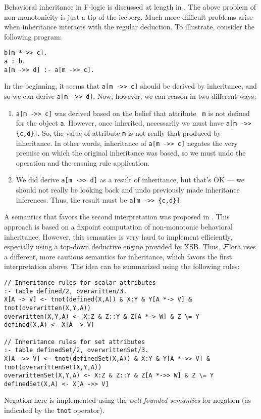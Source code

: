\documentclass[11pt]{article}
\newcommand{\FLORA}{{\mbox{${\cal F}${\sc lora}}}\xspace}
\begin{document}
Behavioral inheritance in F-logic is discussed at length in \cite{KLW95}.
The above problem of non-monotonicity is just a tip of the iceberg. Much
more difficult problems arise when inheritance interacts with the regular
deduction. To illustrate, consider the following program:
\begin{verbatim}
b[m *->> c].
a : b.
a[m ->> d] :- a[m ->> c].
\end{verbatim}
In the beginning, it seems that \verb|a[m ->> c]| should be derived by
inheritance, and so we can derive \verb|a[m ->> d]|. Now, however, we can
reason in two different ways:
\begin{enumerate}
\item \verb|a[m ->> c]| was derived based on the belief that attribute {\tt
    m} is not defined for the object {\tt a}. However, once inherited,
  necessarily we must have \verb|a[m ->> {c,d}]|. So, the value of
  attribute {\tt m} is not really that produced by inheritance. In other
  words, inheritance of \verb|a[m ->> c]| negates the very premise on which
  the original inheritance was based, so we must undo the operation and the
  ensuing rule application.
\item We did derive \verb|a[m ->> d]| as a result of inheritance, but
  that's OK --- we should not really be looking back and undo previously
  made inheritance inferences. Thus, the result must be \verb|a[m ->> {c,d}]|.
\end{enumerate}
A semantics that favors the second interpretation was proposed in
\cite{KLW95}. This approach is based on a fixpoint computation of
non-monotonic behavioral inheritance.  However, this semantics is very hard
to implement efficiently, especially using a top-down deductive engine
provided by XSB. Thus, \FLORA uses a different, more cautious semantics for
inheritance, which favors the first interpretation above.  The idea can be
summarized using the following rules:
\begin{verbatim}
// Inheritance rules for scalar attributes
:- table defined/2, overwritten/3.
X[A -> V] <- tnot(defined(X,A)) & X:Y & Y[A *-> V] & tnot(overwritten(X,Y,A))
overwritten(X,Y,A) <- X:Z & Z::Y & Z[A *-> W] & Z \= Y
defined(X,A) <- X[A -> V]

// Inheritance rules for set attributes
:- table definedSet/2, overwrittenSet/3.
X[A ->> V] <- tnot(definedSet(X,A)) & X:Y & Y[A *->> V] & tnot(overwrittenSet(X,Y,A))
overwrittenSet(X,Y,A) <- X:Z & Z::Y & Z[A *->> W] & Z \= Y
definedSet(X,A) <- X[A ->> V]
\end{verbatim}
Negation here is implemented using the {\em well-founded semantics} for
negation \cite{gelder-alternating-89,gelder-ross-schlipf-91} (as indicated
by the {\tt tnot} operator).
\end{document}
